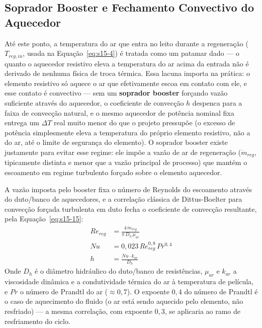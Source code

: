 \documentclass[12pt,a4paper]{article}
\numberwithin{equation}{section}
\numberwithin{table}{section}
\numberwithin{figure}{section}
\begin{document}
		\subsection{\textbf{Soprador Booster e Fechamento Convectivo do Aquecedor}}
		Até este ponto, a temperatura do ar que entra no leito durante a regeneração ($T_{reg,in}$, usada na Equação~\eqref{eq:s15-4}) é tratada como um patamar dado — o quanto o aquecedor resistivo eleva a temperatura do ar acima da entrada não é derivado de nenhuma física de troca térmica. Essa lacuna importa na prática: o elemento resistivo só aquece o ar que efetivamente escoa em contato com ele, e esse contato é convectivo — sem um \textbf{soprador booster} forçando vazão suficiente através do aquecedor, o coeficiente de convecção $h$ despenca para a faixa de convecção natural, e o mesmo aquecedor de potência nominal fixa entrega um $\Delta T$ real muito menor do que o projeto pressupõe (o excesso de potência simplesmente eleva a temperatura do próprio elemento resistivo, não a do ar, até o limite de segurança do elemento). O soprador booster existe justamente para evitar esse regime: ele impõe a vazão de ar de regeneração ($\dot{m}_{reg}$, tipicamente distinta e menor que a vazão principal de processo) que mantém o escoamento em regime turbulento forçado sobre o elemento aquecedor.

		A vazão imposta pelo booster fixa o número de Reynolds do escoamento através do duto/banco de aquecedores, e a correlação clássica de Dittus-Boelter para convecção forçada turbulenta em duto \cite[Cap.~8]{incropera} fecha o coeficiente de convecção resultante, pela Equação~\eqref{eq:s15-15}:
		\begin{equation}\label{eq:s15-15}
		\begin{aligned}
			Re_{reg} &= \frac{4 \, \dot{m}_{reg}}{\pi \, D_h \, \mu_{ar}} \\[4pt]
			Nu &= 0{,}023 \, Re_{reg}^{0{,}8} \, Pr^{0{,}4} \\[4pt]
			h &= \frac{Nu \cdot k_{ar}}{D_h}
		\end{aligned}
	\end{equation}
		Onde $D_h$ é o diâmetro hidráulico do duto/banco de resistências, $\mu_{ar}$ e $k_{ar}$ a viscosidade dinâmica e a condutividade térmica do ar à temperatura de película, e $Pr$ o número de Prandtl do ar ($\approx 0{,}7$). O expoente $0{,}4$ do número de Prandtl é o caso de aquecimento do fluido (o ar está sendo aquecido pelo elemento, não resfriado) — a mesma correlação, com expoente $0{,}3$, se aplicaria ao ramo de resfriamento do ciclo.
\end{document}
